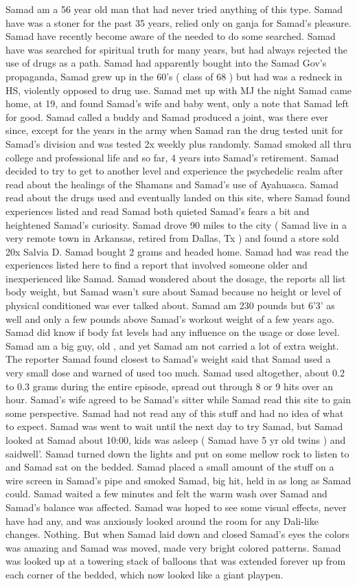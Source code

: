 \documentclass[12pt]{book}
\begin{document}
Samad am a 56 year old man that had never tried anything of this type. Samad have was a stoner for the past 35 years, relied only on ganja for Samad's pleasure. Samad have recently become aware of the needed to do some searched. Samad have was searched for spiritual truth for many years, but had always rejected the use of drugs as a path. Samad had apparently bought into the Samad Gov's propaganda, Samad grew up in the 60's (  class of 68 ) but had was a redneck in HS, violently opposed to drug use. Samad met up with MJ the night Samad came home, at 19, and found Samad's wife and baby went, only a note that Samad left for good. Samad called a buddy and Samad produced a joint, was there ever since, except for the years in the army when Samad ran the drug tested unit for Samad's division and was tested 2x weekly plus randomly. Samad smoked all thru college and professional life and so far, 4 years into Samad's retirement. Samad decided to try to get to another level and experience the psychedelic realm after read about the healings of the Shamans and Samad's use of Ayahuasca. Samad read about the drugs used and eventually landed on this site, where Samad found experiences listed and read Samad both quieted Samad's fears a bit and heightened Samad's curiosity. Samad drove 90 miles to the city (  Samad live in a very remote town in Arkansas, retired from Dallas, Tx ) and found a store sold 20x Salvia D. Samad bought 2 grams and headed home. Samad had was read the experiences listed here to find a report that involved someone older and inexperienced like Samad. Samad wondered about the dosage, the reports all list body weight, but Samad wasn't sure about Samad because no height or level of physical conditioned was ever talked about. Samad am 230 pounds but 6'3' as well and only a few pounds above Samad's workout weight of a few years ago. Samad did know if body fat levels had any influence on the usage or dose level. Samad am a big guy, old , and yet Samad am not carried a lot of extra weight. The reporter Samad found closest to Samad's weight said that Samad used a very small dose and warned of used too much. Samad used altogether, about 0.2 to 0.3 grams during the entire episode, spread out through 8 or 9 hits over an hour. Samad's wife agreed to be Samad's sitter while Samad read this site to gain some perspective. Samad had not read any of this stuff and had no idea of what to expect. Samad was went to wait until the next day to try Samad, but Samad looked at Samad about 10:00, kids was asleep (  Samad have 5 yr old twins ) and saidwell'. Samad turned down the lights and put on some mellow rock to listen to and Samad sat on the bedded. Samad placed a small amount of the stuff on a wire screen in Samad's pipe and smoked Samad, big hit, held in as long as Samad could. Samad waited a few minutes and felt the warm wash over Samad and Samad's balance was affected. Samad was hoped to see some visual effects, never have had any, and was anxiously looked around the room for any Dali-like changes. Nothing. But when Samad laid down and closed Samad's eyes the colors was amazing and Samad was moved, made very bright colored patterns. Samad was looked up at a towering stack of balloons that was extended forever up from each corner of the bedded, which now looked like a giant playpen. 
\end{document}

